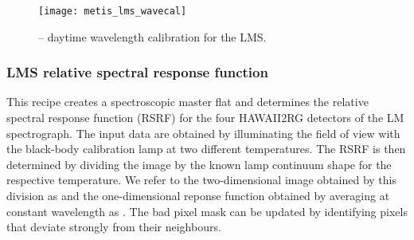 \begin{figure}[hb]
  \centering
  \texttt{[image: metis\_lms\_wavecal]}
  \caption[Recipe: ]{ --
    daytime wavelength calibration for the LMS.}
  \label{fig:metis_lms_wavecal}
\end{figure}


\clearpage
\subsubsection{LMS relative spectral response function}
\label{sssec:lms_rsrf}

This recipe creates a spectroscopic master flat and determines the
relative spectral response function (RSRF) for the four HAWAII2RG
detectors of the LM spectrograph. The input data are obtained by
illuminating the field of view with the black-body calibration lamp at
two different temperatures. The RSRF is then determined by dividing
the image by the known lamp continuum shape for the respective
temperature. We refer to the two-dimensional image obtained by this
division as  and the one-dimensional reponse
function obtained by averaging at constant wavelength as
. The bad pixel mask can be updated by identifying pixels
that deviate strongly from their neighbours.

